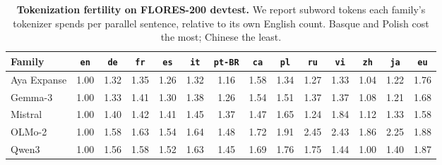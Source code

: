 \begin{table}[t]
\centering
\caption{\textbf{Tokenization fertility on FLORES-200 devtest.} We report subword tokens each family's tokenizer spends per parallel sentence, relative to its own English count. Basque and Polish cost the most; Chinese the least.}
\small
\setlength{\tabcolsep}{4pt}
\begin{tabular}{lccccccccccccc}
\toprule
\textbf{Family} & \texttt{en} & \texttt{de} & \texttt{fr} & \texttt{es} & \texttt{it} & \texttt{pt-BR} & \texttt{ca} & \texttt{pl} & \texttt{ru} & \texttt{vi} & \texttt{zh} & \texttt{ja} & \texttt{eu} \\
\midrule
Aya Expanse & 1.00 & 1.32 & 1.35 & 1.26 & 1.32 & 1.16 & 1.58 & 1.34 & 1.27 & 1.33 & 1.04 & 1.22 & 1.76 \\
Gemma-3 & 1.00 & 1.33 & 1.41 & 1.30 & 1.38 & 1.26 & 1.54 & 1.51 & 1.37 & 1.37 & 1.08 & 1.21 & 1.68 \\
Mistral & 1.00 & 1.40 & 1.42 & 1.41 & 1.45 & 1.37 & 1.47 & 1.65 & 1.24 & 1.84 & 1.12 & 1.33 & 1.58 \\
OLMo-2 & 1.00 & 1.58 & 1.63 & 1.54 & 1.64 & 1.48 & 1.72 & 1.91 & 2.45 & 2.43 & 1.86 & 2.25 & 1.88 \\
Qwen3 & 1.00 & 1.56 & 1.58 & 1.52 & 1.63 & 1.45 & 1.69 & 1.76 & 1.75 & 1.44 & 1.00 & 1.40 & 1.87 \\
\bottomrule
\end{tabular}
\label{tab:fertility}
\end{table}
